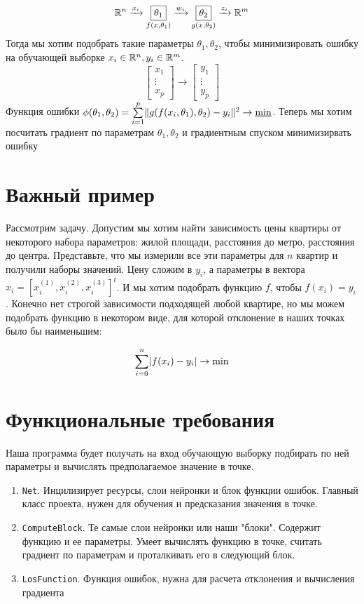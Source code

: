 \documentclass{article}
\begin{document}
$$
\R^n \xrightarrow[]{x_i} \underset{f(x, \theta_1)}{\boxed{\theta_1}} \xrightarrow[]{w_i} \underset{g(x, \theta_2)}{\boxed{\theta_2}} \xrightarrow[]{z_i} \R^m
$$
Тогда мы хотим подобрать такие параметры $\theta_1, \theta_2$, чтобы минимизировать ошибку на обучающей выборке $x_i \in \R^n, y_i \in \R^m$.
$$
\begin{bmatrix}
x_1\\
\vdots\\
x_p
\end{bmatrix}
\rightarrow
\begin{bmatrix}
y_1\\
\vdots\\
y_p
\end{bmatrix}
$$
Функция ошибки $\phi(\theta_1, \theta_2) = \Sum{i = 1}{p} \|g(f(x_i, \theta_1), \theta_2) - y_i\|^2 \rightarrow \underline{\min}$. Теперь мы хотим посчитать градиент по параметрам $\theta_1, \theta_2$ и градиентным спуском минимизирвать ошибку

\section{Важный пример}

Рассмотрим задачу. Допустим мы хотим найти зависимость цены квартиры от некоторого набора параметров: жилой площади, расстояния до метро, расстояния до центра. Представьте, что мы измерили все эти параметры для $n$ квартир и получили наборы значений. Цену сложим в $y_i$, а параметры в вектора
$x_i =[x_i^{(1)}, x_i^{(2)}, x_i^{(3)}]^t$. И мы хотим подобрать функцию $f$, чтобы $f(x_i) = y_i$. Конечно нет строгой зависимости подходящей любой квартире, но мы можем подобрать функцию в некотором виде, для которой отклонение в наших точках было бы наименьшим:

$$
\Sum{i = 0}{n} |f(x_i) - y_i| \rightarrow \min
$$

\section{Функциональные требования}
Наша программа будет получать на вход обучающую выборку подбирать по ней параметры и вычислять предполагаемое значение в точке.
\begin{enumerate}
\item \texttt{Net}. Инцилизирует ресурсы, слои нейронки и блок функции ошибок. Главный класс проекта, нужен для обучения и предсказания значения в точке.
\item \texttt{ComputeBlock}.  Те самые слои нейронки или наши "блоки". Содержит функцию и ее параметры. Умеет вычислять функцию в точке, считать градиент по параметрам и проталкивать его в следующий блок.
\item \texttt{LosFunction}. Функция ошибок, нужна для расчета отклонения и вычисления градиента
\end{enumerate}
\end{document}
